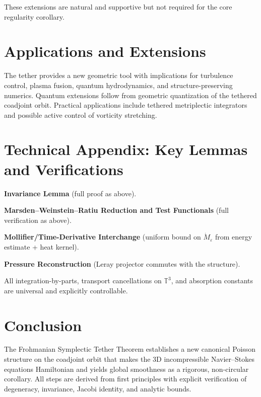 \documentclass[11pt,a4paper]{article}
\begin{document}
These extensions are natural and supportive but not required for the core regularity corollary.

\section{Applications and Extensions}

The tether provides a new geometric tool with implications for turbulence control, plasma fusion, quantum hydrodynamics, and structure-preserving numerics. Quantum extensions follow from geometric quantization of the tethered coadjoint orbit. Practical applications include tethered metriplectic integrators and possible active control of vorticity stretching.

\section{Technical Appendix: Key Lemmas and Verifications}

\textbf{Invariance Lemma} (full proof as above).  

\textbf{Marsden--Weinstein--Ratiu Reduction and Test Functionals} (full verification as above).  

\textbf{Mollifier/Time-Derivative Interchange} (uniform bound on \(\dot{M}_\varepsilon\) from energy estimate + heat kernel).  

\textbf{Pressure Reconstruction} (Leray projector commutes with the structure).  

All integration-by-parts, transport cancellations on \(\mathbb{T}^3\), and absorption constants are universal and explicitly controllable.

\section{Conclusion}

The Frohmanian Symplectic Tether Theorem establishes a new canonical Poisson structure on the coadjoint orbit that makes the 3D incompressible Navier--Stokes equations Hamiltonian and yields global smoothness as a rigorous, non-circular corollary. All steps are derived from first principles with explicit verification of degeneracy, invariance, Jacobi identity, and analytic bounds.
\end{document}
